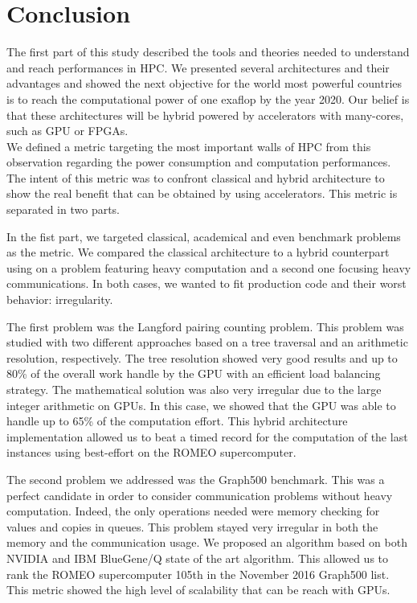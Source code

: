\chapter*{Conclusion}
The first part of this study described the tools and theories needed to understand and reach performances in HPC. 
We presented several architectures and their advantages and showed the next objective for the world most powerful countries is to reach the computational power of one exaflop by the year 2020. 
Our belief is that these architectures will be hybrid powered by accelerators with many-cores, such as GPU or FPGAs. \\

We defined a metric targeting the most important walls of HPC from this observation regarding the power consumption and computation performances.
The intent of this metric was to confront classical and hybrid architecture to show the real benefit that can be obtained by using accelerators. 
This metric is separated in two parts. 

In the fist part, we targeted classical, academical and even benchmark problems as the metric. 
We compared the classical architecture to a hybrid counterpart using on a problem featuring heavy computation and a second one focusing heavy communications. 
In both cases, we wanted to fit production code and their worst behavior: irregularity. 

The first problem was the Langford pairing counting problem. 
This problem was studied with two different approaches based on a tree traversal and an arithmetic resolution, respectively. 
The tree resolution showed very good results and up to 80\% of the overall work handle by the GPU with an efficient load balancing strategy. 
The mathematical solution was also very irregular due to the large integer arithmetic on GPUs. 
In this case, we showed that the GPU was able to handle up to 65\% of the computation effort. 
This hybrid architecture implementation allowed us to beat a timed record for the computation of the last instances using best-effort on the ROMEO supercomputer. 

The second problem we addressed was the Graph500 benchmark. 
This was a perfect candidate in order to consider communication problems without heavy computation. 
Indeed, the only operations needed were memory checking for values and copies in queues. 
This problem stayed very irregular in both the memory and the communication usage. 
We proposed an algorithm based on both NVIDIA and IBM BlueGene/Q state of the art algorithm. 
This allowed us to rank the ROMEO supercomputer 105th in the November 2016 Graph500 list.
This metric showed the high level of scalability that can be reach with GPUs.\\

